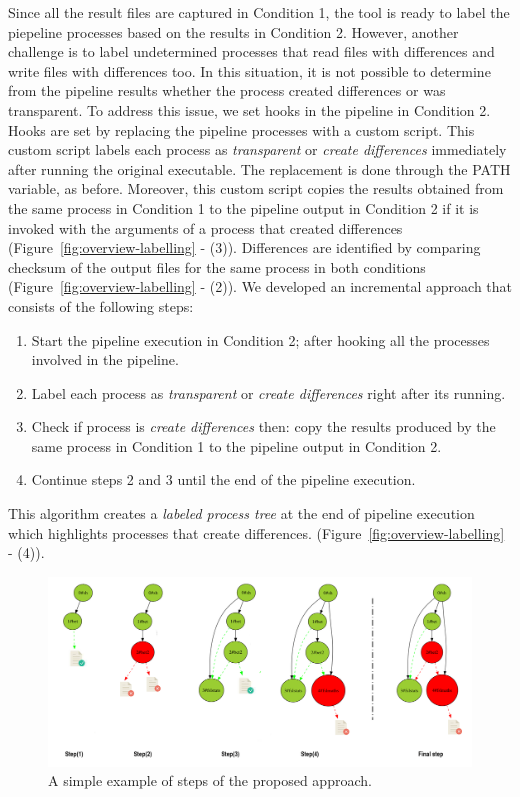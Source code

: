 \documentclass[a4paper,num-refs]{oup-contemporary}
\begin{document}
Since all the result files are captured in Condition 1, the tool 
is ready to label the piepeline processes based on the results in Condition 2.
However, another challenge is to label undetermined processes that read files with 
differences and write files with differences too. In this
situation, it is not possible to determine from the pipeline results 
whether the process created differences or 
was transparent.
To address this issue, we set hooks in the pipeline 
in Condition 2. Hooks are set by replacing the pipeline 
processes with a custom script. This custom script labels each process 
as \emph{transparent} or \emph{create differences} immediately after running 
the original executable. 
The replacement is done through the PATH variable, as before. Moreover, 
this custom script copies the results obtained from the same process in 
Condition 1 to the pipeline output in Condition 2 if 
it is invoked with the arguments of a process that created differences 
(Figure~\ref{fig:overview-labelling} - (3)). 
Differences are identified by comparing checksum of the output files for 
the same process in both conditions (Figure~\ref{fig:overview-labelling} - (2)).
We developed an incremental approach that consists of the following steps: 

\begin{enumerate}
  \item Start the pipeline execution in Condition 2; 
        after hooking all the processes involved in the pipeline.
  \item Label each process as \emph{transparent} or \emph{create differences} 
        right after its running.
  \item Check if process is \emph{create differences} then: 
        copy the results produced by the same process in Condition 1 to the 
        pipeline output in Condition 2. 
  \item Continue steps 2 and 3 until the end of the pipeline execution.
\end{enumerate}

This algorithm creates a \emph{labeled process tree} at the end of pipeline execution 
which highlights processes that create differences.
(Figure~\ref{fig:overview-labelling} - (4)).

\begin{figure}
  \centering
  \includegraphics[width=\columnwidth]{images/iterative_modif}
  \caption{A simple example of steps of the proposed approach.}
  \label{fig:iterations}
\end{figure}
\end{document}
